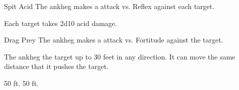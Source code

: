   \begin{freeability}{Spit Acid}
       The ankheg makes a  attack
        vs. Reflex against each target.
    
    \hit Each target takes 2d10 acid damage.
    \end{freeability}
  

    \begin{freeability}{Drag Prey}
       The ankheg makes a  attack
        vs. Fortitude against the target.
    
    \hit The ankheg  the target up to 30 feet in any direction.
          It can move the same distance that it pushes the target.
    \end{freeability}
  
      
       50 ft.
     50 ft.
  
